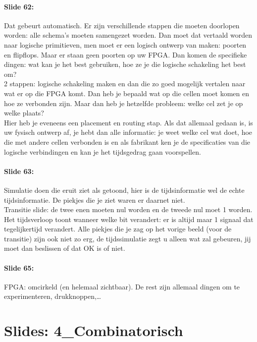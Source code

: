 \documentclass[10pt,a4paper]{book}
\begin{document}
\paragraph{Slide 62:} Dat gebeurt automatisch. Er zijn verschillende stappen die moeten doorlopen worden: alle schema's moeten samengezet worden. Dan moet dat vertaald worden naar logische primitieven, men moet er een logisch ontwerp van maken: poorten en flipflops. Maar er staan geen poorten op uw FPGA. Dan komen de specifieke dingen: wat kan je het best gebruiken, hoe ze je die logische schakeling het best om? \\
2 stappen: logische schakeling maken en dan die zo goed mogelijk vertalen naar wat er op die FPGA komt. Dan heb je bepaald wat op die cellen moet komen en hoe ze verbonden zijn. Maar dan heb je hetzelfde probleem: welke cel zet je op welke plaats?\\
Hier heb je eveneens een placement en routing stap. Als dat allemaal gedaan is, is uw fysisch ontwerp af, je hebt dan alle informatie: je weet welke cel wat doet, hoe die met andere cellen verbonden is en als fabrikant ken je de specificaties van die logische verbindingen en kan je het tijdsgedrag gaan voorspellen.

\paragraph{Slide 63:} Simulatie doen die eruit ziet als getoond, hier is de tijdsinformatie wel de echte tijdsinformatie. De piekjes die je ziet waren er daarnet niet.\\
Transitie slide: de twee enen moeten nul worden en de tweede nul moet 1 worden. Het tijdsverloop toont wanneer welke bit verandert: er is altijd maar 1 signaal dat tegelijkertijd verandert. Alle piekjes die je zag op het vorige beeld (voor de transitie) zijn ook niet zo erg, de tijdssimulatie zegt u alleen wat zal gebeuren, jij moet dan beslissen of dat OK is of niet. 

\paragraph{Slide 65:} FPGA: omcirkeld (en helemaal zichtbaar). De rest zijn allemaal dingen om te experimenteren, drukknoppen,\ldots

\section{Slides: 4\_Combinatorisch}
\end{document}
